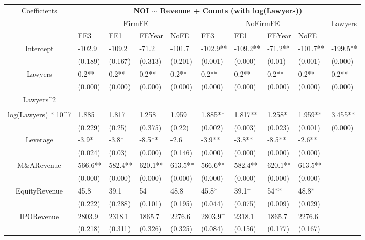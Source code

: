 \documentclass{article}
\begin{document}
\begin{table}[H]
\centering
\begin{tabular}{|clllllllll|}
\hline
\multirow{3}{*}{Coefficients} & \multicolumn{9}{c|}{\textbf{NOI $\sim$ Revenue + Counts (with log(Lawyers))}} \\
\cline{2-10}
& \multicolumn{4}{c}{FirmFE} & \multicolumn{4}{c}{NoFirmFE} & \multirow{2}{*}{Lawyers} \\
\cline{2-9}
& FE3 & FE1 & FEYear & NoFE & FE3 & FE1 & FEYear & NoFE &  \\
\hline
 
Intercept & -102.9 & -109.2 & -71.2 & -101.7 & -102.9** & -109.2** & -71.2** & -101.7** & -199.5** \\ 
   & (0.189) & (0.167) & (0.313) & (0.201) & (0.001) & (0.000) & (0.01) & (0.001) & (0.000) \\ 
  Lawyers & 0.2** & 0.2** & 0.2** & 0.2** & 0.2** & 0.2** & 0.2** & 0.2** & 0.2** \\ 
   & (0.000) & (0.000) & (0.000) & (0.000) & (0.000) & (0.000) & (0.000) & (0.000) & (0.000) \\ 
  Lawyers^2 &  &  &  &  &  &  &  &  &  \\ 
   &  &  &  &  &  &  &  &  &  \\ 
  log(Lawyers) * 10^7 & 1.885 & 1.817 & 1.258 & 1.959 & 1.885** & 1.817** & 1.258* & 1.959** & 3.455** \\ 
   & (0.229) & (0.25) & (0.375) & (0.22) & (0.002) & (0.003) & (0.023) & (0.001) & (0.000) \\ 
  Leverage & -3.9* & -3.8* & -8.5** & -2.6 & -3.9** & -3.8** & -8.5** & -2.6** &  \\ 
   & (0.024) & (0.03) & (0.000) & (0.146) & (0.000) & (0.000) & (0.000) & (0.000) &  \\ 
  M\&ARevenue & 566.6** & 582.4** & 620.1** & 613.5** & 566.6** & 582.4** & 620.1** & 613.5** &  \\ 
   & (0.000) & (0.000) & (0.000) & (0.000) & (0.000) & (0.000) & (0.000) & (0.000) &  \\ 
  EquityRevenue & 45.8 & 39.1 & 54 & 48.8 & 45.8* & 39.1$^{+}$ & 54** & 48.8* &  \\ 
   & (0.222) & (0.288) & (0.101) & (0.195) & (0.044) & (0.075) & (0.009) & (0.029) &  \\ 
  IPORevenue & 2803.9 & 2318.1 & 1865.7 & 2276.6 & 2803.9$^{+}$ & 2318.1 & 1865.7 & 2276.6 &  \\ 
   & (0.218) & (0.311) & (0.326) & (0.325) & (0.084) & (0.156) & (0.177) & (0.167) &  \\ 

\end{tabular}
\end{table}
\end{document}
